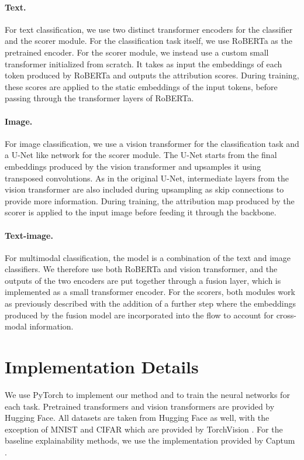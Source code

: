 \paragraph{Text.} For text classification, we use two distinct transformer encoders \cite{transformer} for the classifier and the scorer module. For the classification task itself, we use RoBERTa \cite{roberta} as the pretrained encoder. For the scorer module, we instead use a custom small transformer initialized from scratch. It takes as input the embeddings of each token produced by RoBERTa and outputs the attribution scores. During training, these scores are applied to the static embeddings of the input tokens, before passing through the transformer layers of RoBERTa.


\paragraph{Image.} For image classification, we use a vision transformer \cite{vit} for the classification task and a U-Net \cite{unet} like network for the scorer module. The U-Net starts from the final embeddings produced by the vision transformer and upsamples it using transposed convolutions. As in the original U-Net, intermediate layers from the vision transformer are also included during upsampling as skip connections to provide more information. During training, the attribution map produced by the scorer is applied to the input image before feeding it through the backbone.


\paragraph{Text-image.} For multimodal classification, the model is a combination of the text and image classifiers. We therefore use both RoBERTa and vision transformer, and the outputs of the two encoders are put together through a fusion layer, which is implemented as a small transformer encoder. For the scorers, both modules work as previously described with the addition of a further step where the embeddings produced by the fusion model are incorporated into the flow to account for cross-modal information.




\section{Implementation Details}

We use PyTorch \cite{pytorch} to implement our method and to train the neural networks for each task. Pretrained transformers and vision transformers are provided by Hugging Face. All datasets are taken from Hugging Face \cite{huggingface} as well, with the exception of MNIST and CIFAR which are provided by TorchVision \cite{torchvision}. For the baseline explainability methods, we use the implementation provided by Captum \cite{captum}.  

